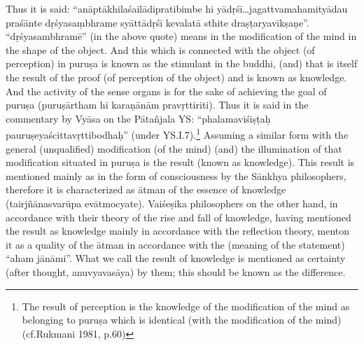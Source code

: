 Thus it is said: “anāptākhilaśailādipratibimbe hi yādṛśī…jagattvamaha\-mityādau praśānte dṛśyasaṃbhrame syāttādṛśī kevalatā sthite draṣṭa\-ryavīkṣaṇe”. “dṛśyasambhramē” (in the above quote) means in the modification of the mind in the shape of the object. And this which is connected with the object (of perception) in puruṣa is known as the stimulant in the buddhi, (and) that is itself the result of the proof (of perception of the object) and is known as knowledge. And the activity of the sense organs is for the sake of achieving the goal of puruṣa (puruṣārtham hi karaṇānām pravṛttiriti). Thus it is said in the commentary by Vyāsa on the Pātañjala YS: “phalamaviśiṣṭaḥ pauruṣeyaścittavṛttibodhaḥ” (under YS.I.7).\footnote{The result of perception is the knowledge of the modification of the mind as belonging to puruṣa which is identical (with the modification of the mind) (cf.Rukmani 1981, p.60)} Assuming a similar form with the general (unqualified) modification (of the mind) (and) the illumination of that modification situated in puruṣa is the result (known as knowledge). This result is mentioned mainly as in the form of consciousness by the Sānkhya philosophers, therefore it is characterized as ātman of the essence of knowledge (tairjñānasvarūpa evātmocyate). Vaiśeṣika philosophers on the other hand, in accordance with their theory of the rise and fall of knowledge, having mentioned the result as knowledge mainly in accordance with the reflection theory, menton it as a quality of the ātman in accordance with the (meaning of the statement) “aham jānāmi”. What we call the result of knowledge is mentioned as certainty (after thought, anuvyavasāya) by them; this should be known as the difference.




